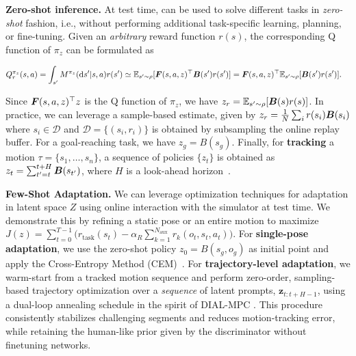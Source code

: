 \textbf{Zero-shot inference.} \label{sec:inference}At test time, \method{} can be used to solve different tasks in \emph{zero-shot} fashion, i.e., without performing additional task-specific learning, planning, or fine-tuning. Given an \emph{arbitrary} reward function $r(s)$, the corresponding Q function of $\pi_z$ can be formulated as 
%
\begin{small}
\begin{align*}
    Q_r^{\pi_z}(s,a) &= %
    \int_{s'} M^{\pi_z}(\mathrm{d}s' | s, a) r(s')
    \simeq \mathbb{E}_{s'\sim \rho} [ \forward(s,a,z)^\top \backward(s') r(s')] =
    \forward(s,a,z)^\top \mathbb{E}_{s'\sim \rho} [ \backward(s') r(s')].
\end{align*}
\end{small}
%
Since $\boldsymbol{F}(s,a,z)^\top z$ is the Q function of $\pi_z$, we have $z_r = \mathbb{E}_{s'\sim \rho}[\boldsymbol{B}(s) r(s)]$. 
In practice, we can leverage a sample-based estimate, given by $z_r =\frac{1}{N} \sum_i r(s_i) \boldsymbol{B}(s_i)$ where $s_i \in \mathcal{D}$ and $\mathcal{D} = \{(s_i,r_i)\}$ is obtained by subsampling the online replay buffer. 
For a goal-reaching task, we have $z_g=B(s_g)$. 
Finally, for \textbf{tracking} a motion $\tau=\{s_1,\ldots,s_n\}$, a sequence of policies $\{z_t\}$ is obtained as $z_t = \sum_{t'=t}^{t+H} \boldsymbol{B}(s_{t'})$, where $H$ is a look-ahead horizon~\citep{Pirotta24fastimitation}. 

\textbf{Few-Shot Adaptation.}
\label{sec:adaption}We can leverage optimization techniques for adaptation in latent space $Z$ using online interaction with the simulator at test time.
We demonstrate this by refining a static pose or an entire motion to maximize $J(z)=\sum_{t=0}^{T-1}\Big(r_{\text{task}}(s_t)-\alpha_{R}\textstyle\sum_{k=1}^{N_{\text{aux}}}r_k(o_t,s_t,a_t)\Big)$. For \textbf{single-pose adaptation}, we use the zero-shot policy $z_0 = B(s_g, o_g)$ as initial point and apply the Cross-Entropy Method (CEM)~\citep{rubinstein1999cross,rubinstein2004cross}. 
For \textbf{trajectory-level adaptation}, we warm-start from a tracked motion sequence and perform zero-order, sampling-based trajectory optimization over a \emph{sequence} of latent prompts, $\mathbf z_{t:t+H-1}$, using a dual-loop annealing schedule in the spirit of DIAL-MPC \citep{xue2025full}. This procedure consistently stabilizes challenging segments and reduces motion-tracking error, while retaining the human-like prior given by the discriminator without finetuning networks.




